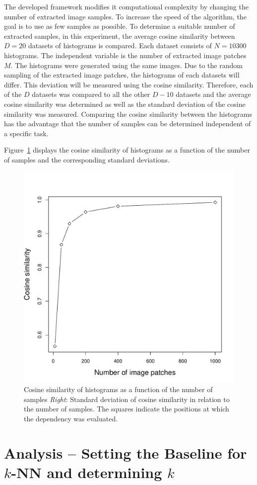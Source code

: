 \documentclass{report}
\begin{document}
The developed framework modifies it computational complexity by
changing the number of extracted image samples. To increase the speed
of the algorithm, the goal is to use as few samples as possible. To
determine a suitable number of extracted samples, in this experiment,
the average cosine similarity between $D = 20$ datasets of histograms
is compared. Each dataset consists of $N = 10300$ histograms. The
independent variable is the number of extracted image patches $M$. The
histograms were generated using the same images. Due to the random
sampling of the extracted image patches, the histograms of each
datasets will differ. This deviation will be measured using the cosine
similarity. Therefore, each of the $D$ datasets was compared to all
the other $D - 10$ datasets and the average cosine similarity was
determined as well as the standard deviation of the cosine similarity
was measured. Comparing the cosine similarity between the histograms
has the advantage that the number of samples can be determined
independent of a specific task.

Figure~\ref{fig:cosine} displays the cosine similarity of histograms
as a function of the number of samples and the corresponding standard
deviations.

\begin{figure}[h!]
\begin{center}
\includegraphics[width=0.336\columnwidth]{samples_vs_similarity}
\caption{{\label{fig:cosine} Cosine similarity of histograms as a
    function of the number of samples \emph{Right}: Standard deviation
    of cosine similarity in relation to the number of samples. The
    squares indicate the positions at which the dependency was
    evaluated.%
  }}
\end{center}
\end{figure}


\section{Analysis -- Setting the Baseline for $k$-NN and determining
  $k$}
\label{sec:detk}
\end{document}
